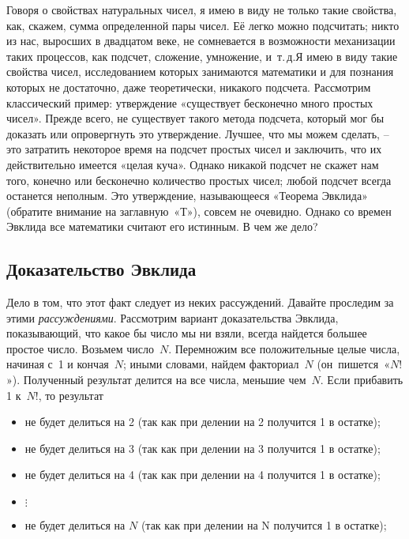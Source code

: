 \documentclass[../main.tex]{subfiles}
\begin{document}
Говоря о свойствах натуральных чисел, я имею в виду не только такие свойства, как, скажем, сумма определенной пары чисел. Её легко можно подсчитать; никто из нас, выросших в двадцатом веке, не сомневается в возможности механизации таких процессов, как подсчет, сложение, умножение, и~т.\,д.\@ Я имею в виду такие свойства чисел, исследованием которых занимаются математики и для познания которых не достаточно, даже теоретически, никакого подсчета. Рассмотрим классический пример: утверждение «существует бесконечно много простых чисел». Прежде всего, не существует такого метода подсчета, который мог бы доказать или опровергнуть это утверждение. Лучшее, что мы можем сделать, \--- это затратить некоторое время на подсчет простых чисел и заключить, что их действительно имеется «целая куча». Однако никакой подсчет не скажет нам того, конечно или бесконечно количество простых чисел; любой подсчет всегда останется неполным. Это утверждение, называющееся «Теорема Эвклида» (обратите внимание на заглавную~«Т»), совсем не очевидно. Однако со времен Эвклида все математики считают его истинным. В чем же дело?



\subsection{Доказательство Эвклида}

Дело в том, что этот факт следует из неких рассуждений. Давайте проследим за этими \emph{рассуждениями}. Рассмотрим вариант доказательства Эвклида, показывающий, что какое бы число мы ни взяли, всегда найдется большее простое число. Возьмем число~$N$. Перемножим все положительные целые числа, начиная с~1 и кончая~$N$; иными словами, найдем факториал~$N$ (он~пишется~«$N!$»). Полученный результат делится на все числа, меньшие чем~$N$. Если прибавить 1 к~$N!$, то результат
%
\begin{itemize}[label={}, noitemsep, topsep=6pt]
    \item не будет делиться на 2 (так как при делении на 2 получится 1 в остатке);
    \item не будет делиться на 3 (так как при делении на 3 получится 1 в остатке);
    \item не будет делиться на 4 (так как при делении на 4 получится 1 в остатке);
    \item $\vdots$
    \item не будет делиться на $N$ (так как при делении на N получится 1 в остатке);
\end{itemize}
\end{document}
